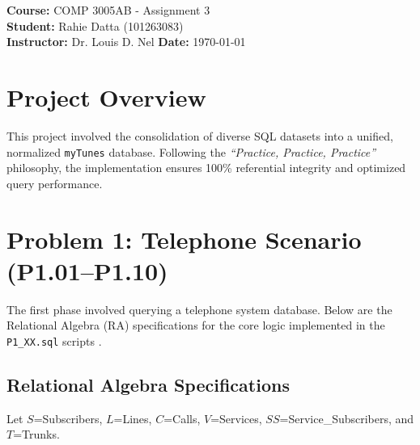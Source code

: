 \documentclass[11pt]{article}
\begin{document}
\begin{tcolorbox}[colback=darkblue!5, colframe=darkblue!75!black, title=\centering\Huge{README: myTunes Database Assembly}]
    \LARGE
    \textbf{Course:} COMP 3005AB - Assignment 3 \\
    \textbf{Student:} Rahie Datta (101263083) \\
    \textbf{Instructor:} Dr. Louis D. Nel \hfill \textbf{Date:} \today
\end{tcolorbox}

\section{Project Overview}
This project involved the consolidation of diverse SQL datasets into a unified, normalized \texttt{myTunes} database. Following the \textit{``Practice, Practice, Practice''} philosophy, the implementation ensures 100\% referential integrity and optimized query performance.

\section{Problem 1: Telephone Scenario (P1.01--P1.10)}
The first phase involved querying a telephone system database. Below are the Relational Algebra (RA) specifications for the core logic implemented in the \texttt{P1\_XX.sql} scripts \cite{nel_er_model}.

\subsection{Relational Algebra Specifications}
Let $S$=Subscribers, $L$=Lines, $C$=Calls, $V$=Services, $SS$=Service\_Subscribers, and $T$=Trunks.
\end{document}
